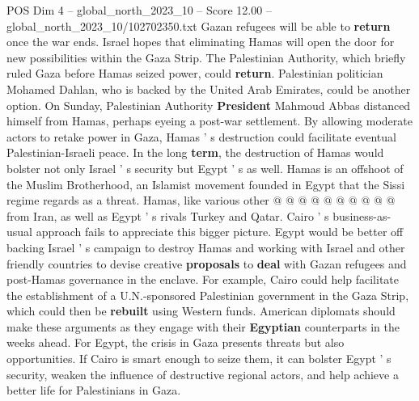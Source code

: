 \begin{textsample}{POS Dim 4 – global\_north\_2023\_10 – Score 12.00 – global\_north\_2023\_10/102702350.txt}
Gazan refugees will be able to \textbf{return} once the war ends.
Israel hopes that eliminating Hamas will open the door for new possibilities within the Gaza Strip.
The Palestinian Authority, which briefly ruled Gaza before Hamas seized power, could \textbf{return}.
Palestinian politician Mohamed Dahlan, who is backed by the United Arab Emirates, could be another option.
On Sunday, Palestinian Authority \textbf{President} Mahmoud Abbas distanced himself from Hamas, perhaps eyeing a post-war settlement.
By allowing moderate actors to retake power in Gaza, Hamas ' s destruction could facilitate eventual Palestinian-Israeli peace.
In the long \textbf{term}, the destruction of Hamas would bolster not only Israel ' s security but Egypt ' s as well.
Hamas is an offshoot of the Muslim Brotherhood, an Islamist movement founded in Egypt that the Sissi regime regards as a threat.
Hamas, like various other @ @ @ @ @ @ @ @ @ @ from Iran, as well as Egypt ' s rivals Turkey and Qatar.
Cairo ' s business-as-usual approach fails to appreciate this bigger picture.
Egypt would be better off backing Israel ' s campaign to destroy Hamas and working with Israel and other friendly countries to devise creative \textbf{proposals} to \textbf{deal} with Gazan refugees and post-Hamas governance in the enclave.
For example, Cairo could help facilitate the establishment of a U.N.-sponsored Palestinian government in the Gaza Strip, which could then be \textbf{rebuilt} using Western funds.
American diplomats should make these arguments as they engage with their \textbf{Egyptian} counterparts in the weeks ahead.
For Egypt, the crisis in Gaza presents threats but also opportunities.
If Cairo is smart enough to seize them, it can bolster Egypt ' s security, weaken the influence of destructive regional actors, and help achieve a better life for Palestinians in Gaza.

\end{textsample}
